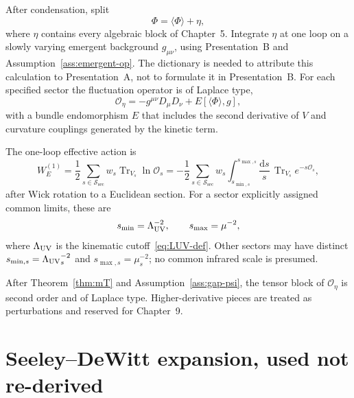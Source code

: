 After condensation, split
\begin{equation}
  \label{eq:split-loop}
  \Phi=\langle\Phi\rangle+\eta,
\end{equation}
where \(\eta\) contains every algebraic block of Chapter~5. Integrate \(\eta\) at one loop on a slowly varying emergent
background \(g_{\mu\nu}\), using Presentation~B and
Assumption~\ref{ass:emergent-op}. The dictionary is needed to
attribute this calculation to Presentation~A, not to formulate it in
Presentation~B. For each specified sector the fluctuation operator is
of Laplace type,
\begin{equation}
  \label{eq:O-eta}
  \mathcal{O}_\eta
  =-g^{\mu\nu}D_\mu D_\nu+E[\langle\Phi\rangle,g],
\end{equation}
with a bundle endomorphism \(E\) that includes the second derivative
of \(V\) and curvature couplings generated by the kinetic term.

The one-loop effective action is
\begin{equation}
  \label{eq:W-again}
  W_E^{(1)}
  =\frac12\sum_{s\in\mathcal{S}_{\mathrm{sec}}}w_s
      \operatorname{Tr}_{V_s}\ln\mathcal O_s
  =-\frac12\sum_{s\in\mathcal{S}_{\mathrm{sec}}}w_s
    \int_{s_{\min,s}}^{s_{\max,s}}\frac{\mathrm{d}s}{s}\,
    \operatorname{Tr}_{V_s}e^{-s\mathcal O_s},
\end{equation}
after Wick rotation to a Euclidean section. For a sector explicitly
assigned common limits, these are
\begin{equation}
  \label{eq:s-limits}
  s_{\min}=\Lambda_{\mathrm{UV}}^{-2},\qquad
  s_{\max}=\mu^{-2},
\end{equation}
where \(\Lambda_{\mathrm{UV}}\) is the kinematic cutoff~\eqref{eq:LUV-def}. Other
sectors may have distinct \(s_{\min,s}={\Lambda_{\mathrm{UV}}}_s^{-2}\) and
\(s_{\max,s}=\mu_s^{-2}\); no common infrared scale is presumed.

\begin{assumption}
  \label{ass:laplace}
  After Theorem~\ref{thm:mT} and Assumption~\ref{ass:gap-psi}, the
  tensor block of \(\mathcal{O}_\eta\) is second order and of Laplace
  type. Higher-derivative pieces are treated as perturbations and
  reserved for Chapter~9.
\end{assumption}

\section{Seeley--DeWitt expansion, used not re-derived}
\label{sec:ch8-SDW}

